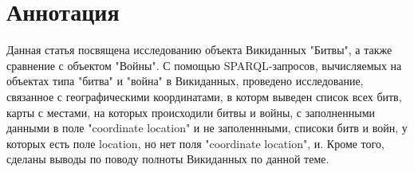\section{Аннотация}

Данная статья посвящена исследованию объекта Викиданных "Битвы", а также сравнение с объектом "Войны". С помощью SPARQL-запросов, вычисляемых на объектах типа "битва" и "война" в Викиданных, проведено исследование, связанное с географическими координатами, в которм выведен список всех битв, карты с местами, на которых происходили битвы и войны, с заполненными данными в поле "coordinate location" и не заполеннными, списоки битв и войн, у которых есть поле location, но нет поля "coordinate location", и. Кроме того, сделаны выводы по поводу полноты Викиданных по данной теме.
